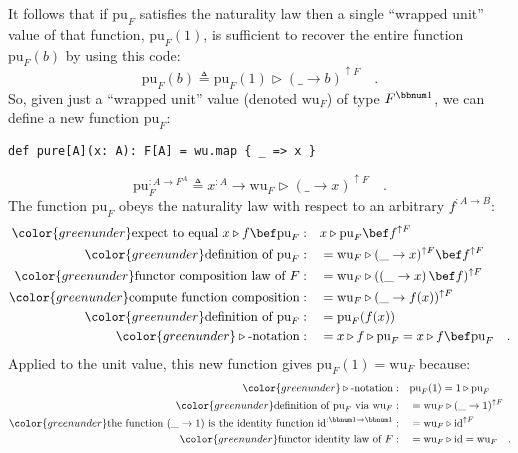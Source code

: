 It follows that if $\text{pu}_{F}$ satisfies the naturality law then
a single \textsf{``}wrapped unit\textsf{''} value of that function, $\text{pu}_{F}(1)$,
is sufficient to recover the entire function $\text{pu}_{F}(b)$ by
using this code:
\[
\text{pu}_{F}(b)\triangleq\text{pu}_{F}(1)\triangleright(\_\rightarrow b)^{\uparrow F}\quad.
\]
So, given just a \textsf{``}wrapped unit\textsf{''} value (denoted $\text{wu}_{F}$)
of type $F^{\bbnum 1}$, we can define a new function $\text{pu}_{F}$:
\begin{lstlisting}
def pure[A](x: A): F[A] = wu.map { _ => x }
\end{lstlisting}
\begin{equation}
\text{pu}_{F}^{:A\rightarrow F^{A}}\triangleq x^{:A}\rightarrow\text{wu}_{F}\triangleright(\_\rightarrow x)^{\uparrow F}\quad.\label{eq:pu-via-wu-def}
\end{equation}
The function $\text{pu}_{F}$ obeys the naturality law with respect
to an arbitrary $f^{:A\rightarrow B}$:
\begin{align*}
{\color{greenunder}\text{expect to equal }x\triangleright f\bef\text{pu}_{F}:}\quad & x\triangleright\text{pu}_{F}\bef f^{\uparrow F}\\
{\color{greenunder}\text{definition of }\text{pu}_{F}:}\quad & =\text{wu}_{F}\triangleright(\_\rightarrow x)^{\uparrow F}\bef f^{\uparrow F}\\
{\color{greenunder}\text{functor composition law of }F:}\quad & =\text{wu}_{F}\triangleright(\left(\_\rightarrow x\right)\bef f)^{\uparrow F}\\
{\color{greenunder}\text{compute function composition}:}\quad & =\text{wu}_{F}\triangleright(\_\rightarrow f(x))^{\uparrow F}\\
{\color{greenunder}\text{definition of }\text{pu}_{F}:}\quad & =\text{pu}_{F}(f(x))\\
{\color{greenunder}\triangleright\text{-notation}:}\quad & =x\triangleright f\triangleright\text{pu}_{F}=x\triangleright f\bef\text{pu}_{F}\quad.
\end{align*}
Applied to the unit value, this new function gives $\text{pu}_{F}(1)=\text{wu}_{F}$
because:
\begin{align*}
{\color{greenunder}\triangleright\text{-notation}:}\quad & \text{pu}_{F}(1)=1\triangleright\text{pu}_{F}\\
{\color{greenunder}\text{definition of }\text{pu}_{F}\text{ via }\text{wu}_{F}:}\quad & =\text{wu}_{F}\triangleright(\_\rightarrow1)^{\uparrow F}\\
{\color{greenunder}\text{the function }(\_\rightarrow1)\text{ is the identity function }\text{id}^{:\bbnum 1\rightarrow\bbnum 1}:}\quad & =\text{wu}_{F}\triangleright\text{id}^{\uparrow F}\\
{\color{greenunder}\text{functor identity law of }F:}\quad & =\text{wu}_{F}\triangleright\text{id}=\text{wu}_{F}\quad.
\end{align*}

